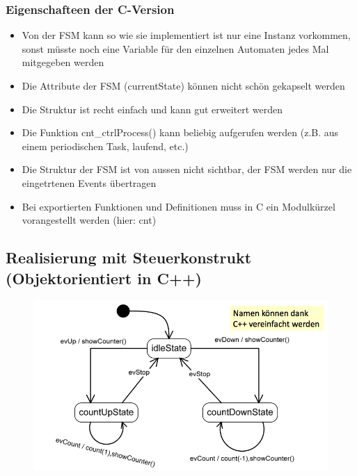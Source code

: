 \subsubsection{Eigenschafteen der C-Version}
\begin{itemize}
  \item Von der FSM kann so wie sie implementiert ist nur eine Instanz vorkommen, sonst müsste noch eine Variable für den einzelnen Automaten jedes Mal mitgegeben werden
  \item Die Attribute der FSM (currentState) können nicht schön gekapselt werden
  \item Die Struktur ist recht einfach und kann gut erweitert werden
  \item Die Funktion cnt\_ctrlProcess() kann beliebig aufgerufen werden (z.B. aus einem periodischen Task, laufend, etc.)
  \item Die Struktur der FSM ist von aussen nicht sichtbar, der FSM werden nur die eingetrtenen Events übertragen
  \item Bei exportierten Funktionen und Definitionen muss in C ein Modulkürzel vorangestellt werden (hier: cnt)
\end{itemize}


\subsection{Realisierung mit Steuerkonstrukt (Objektorientiert in
C++)}

\begin{figure}[h]
  \centering
  \includegraphics[scale = 0.35]{images/FSM/Up_down_counter_obj}
\end{figure}

